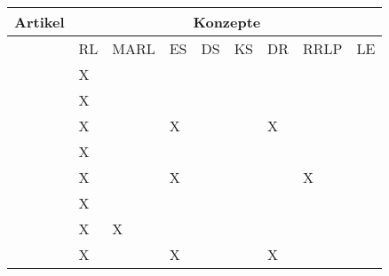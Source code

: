\begin{longtable}{|l|llllllll|}
    \hline
    \multicolumn{1}{|c|}{Artikel} & \multicolumn{8}{c|}{Konzepte}                                                                                                                                                                \\ \hline
    \endhead
                                  & \multicolumn{1}{l|}{RL} & \multicolumn{1}{l|}{MARL} & \multicolumn{1}{l|}{ES} & \multicolumn{1}{l|}{DS} & \multicolumn{1}{l|}{KS} & \multicolumn{1}{l|}{DR} & \multicolumn{1}{l|}{RRLP} & LE \\ \hline
    \cite[]{Sutton.2018}          & \multicolumn{1}{l|}{X}   & \multicolumn{1}{l|}{}     & \multicolumn{1}{l|}{}   & \multicolumn{1}{l|}{}   & \multicolumn{1}{l|}{}   & \multicolumn{1}{l|}{}   & \multicolumn{1}{l|}{}     &    \\ \hline
    \cite[]{Li.2019}              & \multicolumn{1}{l|}{X}   & \multicolumn{1}{l|}{}     & \multicolumn{1}{l|}{}   & \multicolumn{1}{l|}{}   & \multicolumn{1}{l|}{}   & \multicolumn{1}{l|}{}   & \multicolumn{1}{l|}{}     &    \\ \hline
    \cite[]{Zhao.2020}            & \multicolumn{1}{l|}{X}   & \multicolumn{1}{l|}{}     & \multicolumn{1}{l|}{X}   & \multicolumn{1}{l|}{}   & \multicolumn{1}{l|}{}   & \multicolumn{1}{l|}{X}   & \multicolumn{1}{l|}{}     &    \\ \hline
    \cite[]{Wang.2020}            & \multicolumn{1}{l|}{X}   & \multicolumn{1}{l|}{}     & \multicolumn{1}{l|}{}   & \multicolumn{1}{l|}{}   & \multicolumn{1}{l|}{}   & \multicolumn{1}{l|}{}   & \multicolumn{1}{l|}{}     &    \\ \hline
    \cite[]{Zhang.2018}           & \multicolumn{1}{l|}{X}   & \multicolumn{1}{l|}{}     & \multicolumn{1}{l|}{X}   & \multicolumn{1}{l|}{}   & \multicolumn{1}{l|}{}   & \multicolumn{1}{l|}{}   & \multicolumn{1}{l|}{X}     &    \\ \hline
    \cite[]{Cutler.2014}          & \multicolumn{1}{l|}{X}   & \multicolumn{1}{l|}{}     & \multicolumn{1}{l|}{}   & \multicolumn{1}{l|}{}   & \multicolumn{1}{l|}{}   & \multicolumn{1}{l|}{}   & \multicolumn{1}{l|}{}     &    \\ \hline
    \cite[]{Canese.2021}          & \multicolumn{1}{l|}{X}   & \multicolumn{1}{l|}{X}    & \multicolumn{1}{l|}{}   & \multicolumn{1}{l|}{}   & \multicolumn{1}{l|}{}   & \multicolumn{1}{l|}{}   & \multicolumn{1}{l|}{}     &    \\ \hline
    \cite[]{Reda.2020}            & \multicolumn{1}{l|}{X}   & \multicolumn{1}{l|}{}     & \multicolumn{1}{l|}{X}   & \multicolumn{1}{l|}{}   & \multicolumn{1}{l|}{}   & \multicolumn{1}{l|}{X}   & \multicolumn{1}{l|}{}     &    \\ \hline

\end{longtable}
